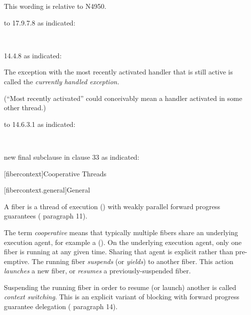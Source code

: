 \newpage
{}\label{api}

This wording is relative to N4950.\cite{Standard}

 to 17.9.7.8  as indicated:

\\

 14.4.8  as indicated:

The exception with the most recently activated handler that is still active is called the \emph{currently handled exception.}

(``Most recently activated'' could conceivably mean a handler activated in some
other thread.)

 to 14.6.3.1  as indicated:

\\

 new final subclause in clause 33  as indicated:

\setcounter{section}{33}
\setcounter{subsection}{10}
\setcounter{secnumdepth}{5}

[fibercontext]{Cooperative Threads}

[fibercontext.general]{General}

\para A fiber is a thread of execution () with
weakly parallel forward progress guarantees ( paragraph 11).

\para The term \emph{cooperative} means that typically multiple fibers share
an underlying execution agent, for example a 
(). On the underlying execution agent, only one
fiber is running at any given time. Sharing that agent is explicit rather than
pre-emptive. The running fiber \emph{suspends} (or \emph{yields}) to another
fiber. This action \emph{launches} a new fiber, or \emph{resumes} a
previously-suspended fiber.

\para Suspending the running fiber in order to resume (or launch) another is
called \emph{context switching}. This is an explicit variant of blocking with
forward progress guarantee delegation ( paragraph 14).

